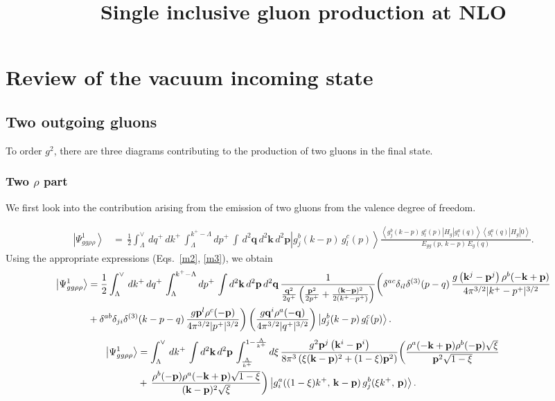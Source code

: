 \documentclass[aps,prd,amsmath,amssymb,nofootinbib]{revtex4-2}
\title{Single inclusive gluon production at NLO}
\numberwithin{equation}{section}
\begin{document}
\tableofcontents 
\section{Review of the vacuum incoming state}\label{sec:vac}
\subsection{Two outgoing gluons}
To order $g^2$, there are three  diagrams contributing to the production of two gluons in the final state.

\subsubsection{Two $\rho$ part}

We first look into the contribution arising from the emission of two gluons from the valence degree of freedom.
\begin{figure}[h]
\end{figure}
\begin{align}
\left|\Psi_{gg\rho\rho}^{1}\right\rangle &=\,\frac{1}{2}\int_{\Lambda}^{\vee}\,dq^{+}\, dk^{+}\,\int_{\Lambda}^{k^{+}-\Lambda}dp^{+}\,\int\, d^{2}\mathbf{q}\, d^{2}\mathbf{k}\, d^{2}\mathbf{p}\left|g_{j}^{b}(k-p)\, g_{l}^{c}(p)\right\rangle \frac{\left\langle g_{j}^{b}(k-p)\, g_{l}^{c}(p)\left|H_{g}\right|g_{i}^{a}(q)\right\rangle \left\langle g_{i}^{a}(q)\left|H_{g}\right|0\right\rangle }{E_{gg}(p,\, k-p)\, E_{g}(q)}.
\end{align}
Using the appropriate expressions (Eqs.~\eqref{m2}, \eqref{m3}), we obtain
\begin{align}\label{ggrhorho1}
\left|\Psi_{gg\rho\rho}^{1}\right\rangle & = \frac{1}{2}\int_{\Lambda}^{\vee}\,dk^{+}\, dq^{+}\,\int_{\Lambda}^{k^{+}-\Lambda}dp^{+}\,\int d^{2}\mathbf{k}\, d^{2}\mathbf{p}\, d^{2}\mathbf{q}\,\frac{1}{\frac{\mathbf{q}^{2}}{2q^{+}}\left(\frac{\mathbf{p}^{2}}{2p^{+}}+\frac{(\mathbf{k}-\mathbf{p})^{2}}{2(k^{+}-p^{+})}\right)} \bigg(\delta^{ac}\delta_{il}\delta^{(3)}(p-q)\,\frac{g\left(\mathbf{k}^{j}-\mathbf{p}^{j}\right)\rho^{b}(-\mathbf{k} +\mathbf{p})}{4\pi^{3/2}|k^{+}-p^{+}|^{3/2}}\notag \\ & +\delta^{ab}\delta_{ji}\delta^{(3)}(k-p-q)\,\frac{g\mathbf{p}^{l}\rho^{c}(-\mathbf{p})}{4\pi^{3/2}|p^{+}|^{3/2}}\bigg) \left(\frac{g\mathbf{q}^{i}\rho^{a}(-\mathbf{q})}{4\pi^{3/2}|q^{+}|^{3/2}}\right)\left|g_{j}^{b}(k-p)\, g_{l}^{c}(p)\right\rangle. 
\end{align} 
\begin{align}
\left|\Psi_{gg\rho\rho}^{1}\right\rangle &=\int_{\Lambda}^{\vee}\,dk^{+}\,\int d^{2}\mathbf{k}\, d^{2}\mathbf{p}\,\int_{\frac{\Lambda}{k^{+}}}^{1-\frac{\Lambda}{k^{+}}}d\xi\,\frac{g^{2}\mathbf{p}^{j}\left(\mathbf{k}^{i}-\mathbf{p}^{i}\right)}{8\pi^{3}\left(\xi(\mathbf{k}-\mathbf{p})^{2}+(1-\xi)\mathbf{p}^{2}\right)}\bigg(\frac{\rho^{a}(-\mathbf{k}+\mathbf{p})\rho^{b}(-\mathbf{p})\sqrt{\xi}}{\mathbf{p}^{2}\sqrt{1-\xi}}\,\notag \\ & +\,\frac{\rho^{b}(-\mathbf{p})\rho^{a}(-\mathbf{k}+\mathbf{p})\sqrt{1-\xi}}{(\mathbf{k}-\mathbf{p})^{2}\sqrt{\xi}}\bigg)\left|g_{i}^{a}((1-\xi)k^{+},\,\mathbf{k}-\mathbf{p})\,g_{j}^{b}(\xi k^{+},\,\mathbf{p})\right\rangle.
\end{align}
\end{document}
